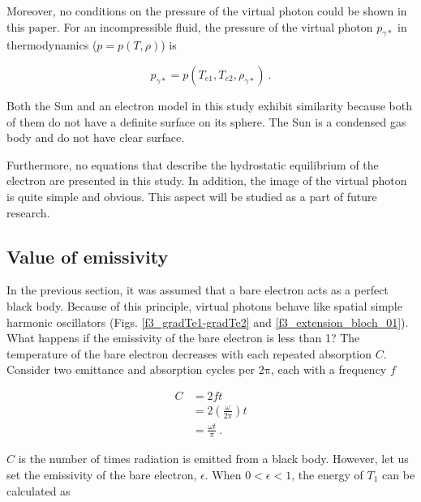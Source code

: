 \documentclass[%
 reprint,
 amsmath,amssymb,
 aps,
]{revtex4-1}
\numberwithin{equation}{section}
\begin{document}
    Moreover, no conditions on the pressure of the virtual photon could be shown in this paper. For an incompressible fluid, the pressure of the virtual photon $p_{\gamma *}$ in thermodynamics ($p = p (T, \rho)$) is

        \begin{equation}
            p_{\gamma *} = p (T_{e1}, T_{e2}, \rho_{\gamma *})
            \ .
        \end{equation}

    Both the Sun and an electron model in this study exhibit similarity because both of them do not have a definite surface on its sphere. The Sun is a condensed gas body and do not have clear surface.

    Furthermore, no equations that describe the hydrostatic equilibrium of the electron are presented in this study. In addition, the image of the virtual photon is quite simple and obvious. This aspect will be studied as a part of future research.

\subsection{Value of emissivity}

    In the previous section, it was assumed that a bare electron acts as a perfect black body. Because of this principle, virtual photons behave like spatial simple harmonic oscillators (Figs. \ref{f3_gradTe1-gradTe2} and \ref{f3_extension_bloch_01}). What happens if the emissivity of the bare electron is less than 1? The temperature of the bare electron decreases with each repeated absorption $ C $. Consider two emittance and absorption cycles per $\mathrm{2 \pi}$, each with a frequency $f$

        \begin{equation}
            \begin{split}
                C
                    &= 2 f t \\
                    &= 2 \left( \frac{\omega}{2 \pi} \right) t \\
                        &= \frac{\omega t}{\pi}
                        \ .
            \end{split}
        \end{equation}

    $C$ is the number of times radiation is emitted from a black body. However, let us set the emissivity of the bare electron, $\epsilon$. When $0 < \epsilon < 1$, the energy of $T_{1}$ can be calculated as
\end{document}
